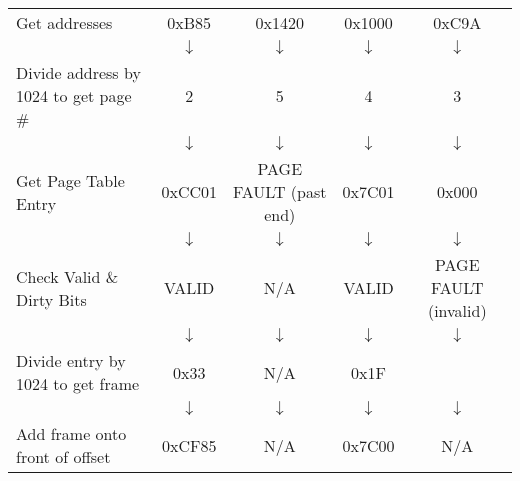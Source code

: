 \documentclass{report}
\begin{document}
\begin{center}
	\begin{tabular}{p{6cm} c c c c}
		Get addresses                         & 0xB85        & 0x1420                & 0x1000       & 0xC9A                \\
		                                      & $\downarrow$ & $\downarrow$          & $\downarrow$ & $\downarrow$         \\
		Divide address by 1024 to get page \# & 2            & 5                     & 4            & 3                    \\
		                                      & $\downarrow$ & $\downarrow$          & $\downarrow$ & $\downarrow$         \\
		Get Page Table Entry                  & 0xCC01       & PAGE FAULT (past end) & 0x7C01       & 0x000                \\
		                                      & $\downarrow$ & $\downarrow$          & $\downarrow$ & $\downarrow$         \\
		Check Valid \& Dirty Bits             & VALID        & N/A                   & VALID        & PAGE FAULT (invalid) \\
		                                      & $\downarrow$ & $\downarrow$          & $\downarrow$ & $\downarrow$         \\
		Divide entry by 1024 to get frame     & 0x33         & N/A                   & 0x1F                                \\
		                                      & $\downarrow$ & $\downarrow$          & $\downarrow$ & $\downarrow$         \\
		Add frame onto front of offset        & 0xCF85       & N/A                   & 0x7C00       & N/A                  \\
	\end{tabular}
\end{center}
\end{document}
